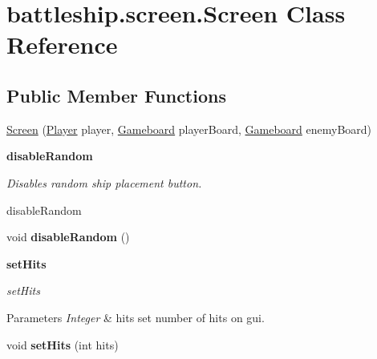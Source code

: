 \hypertarget{classbattleship_1_1screen_1_1Screen}{}\section{battleship.\+screen.\+Screen Class Reference}
\label{classbattleship_1_1screen_1_1Screen}
\subsection*{Public Member Functions}
\begin{DoxyCompactItemize}
\item 
\hyperlink{classbattleship_1_1screen_1_1Screen_aac6ae2de06fa9d0559242ccc2fed0e1f}{Screen} (\hyperlink{classbattleship_1_1game_1_1Player}{Player} player, \hyperlink{classbattleship_1_1gameboard_1_1Gameboard}{Gameboard} player\+Board, \hyperlink{classbattleship_1_1gameboard_1_1Gameboard}{Gameboard} enemy\+Board)
\end{DoxyCompactItemize}
\begin{Indent}{\bf disable\+Random}\par
{\em Disable\textquotesingle{}s random ship placement button.

disable\+Random }\begin{DoxyCompactItemize}
\item 
\hypertarget{classbattleship_1_1screen_1_1Screen_a04e48b790a88b1b92f187d247309991b}{}void {\bfseries disable\+Random} ()\label{classbattleship_1_1screen_1_1Screen_a04e48b790a88b1b92f187d247309991b}

\end{DoxyCompactItemize}
\end{Indent}
\begin{Indent}{\bf set\+Hits}\par
{\em set\+Hits


\begin{DoxyParams}{Parameters}
{\em Integer} & hits set number of hits on gui. \\
\hline
\end{DoxyParams}
}\begin{DoxyCompactItemize}
\item 
\hypertarget{classbattleship_1_1screen_1_1Screen_a8f66addd7ebbe3bac98186eccc1452e4}{}void {\bfseries set\+Hits} (int hits)\label{classbattleship_1_1screen_1_1Screen_a8f66addd7ebbe3bac98186eccc1452e4}

\end{DoxyCompactItemize}
\end{Indent}
